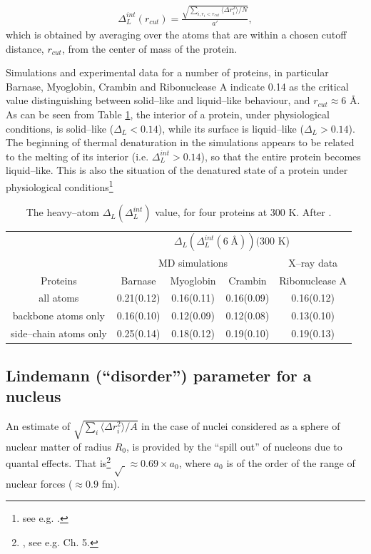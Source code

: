\begin{subappendices}
\begin{align}
\Delta^{int}_L(r_{cut})=\frac{\sqrt{\sum_{i,r_i<r_{cut}}\langle \Delta r_i^2\rangle/N}}{a'},
\end{align}  
which is obtained by averaging over the atoms that are within a chosen cutoff distance, $r_{cut}$, from the center of mass of the protein.

Simulations and experimental data for a number of proteins, in particular Barnase, Myoglobin, Crambin and Ribonuclease A indicate 0.14 as the critical value distinguishing between solid--like and liquid--like behaviour, and $r_{cut}\approx 6$ \AA. As can be seen from Table \ref{tab2C1}, the interior of a protein, under physiological conditions, is solid--like  ($\Delta_L<0.14$), while its surface is liquid--like ($\Delta_L>0.14$). The beginning of thermal denaturation in the simulations appears to be related to the melting of its interior (i.e. $\Delta^{int}_L>0.14$), so that the entire protein becomes liquid--like. This is also the situation of the denatured state of a protein under physiological conditions\footnote{see e.g. \cite{Rosner:17}.} 



\begin{table}[h]
 \begin{tabular}{|c|c|c|c|c|}
 \hline
 &\multicolumn{4}{|c|}{$\Delta_L(\Delta_L^{int}(6\;\text{\AA}))(300$ K)}\\
 \cline{2-5}
 &\multicolumn{3}{|c|}{MD simulations}&X--ray data\\
 \hline
 Proteins&Barnase&Myoglobin&Crambin&Ribonuclease A\\
 \hline
 all atoms&0.21(0.12)&0.16(0.11)&0.16(0.09)&0.16(0.12)\\
 backbone atoms only&0.16(0.10)&0.12(0.09)&0.12(0.08)&0.13(0.10)\\
 side--chain atoms only&0.25(0.14)&0.18(0.12)&0.19(0.10)&0.19(0.13)\\
 \hline
 \end{tabular}
 \caption{The heavy--atom $\Delta_L(\Delta_L^{int})$ value, for four proteins at 300 K. After \cite{Zhou:99}.}\label{tab2C1}
 \end{table}

\subsection{Lindemann (``disorder'') parameter for a nucleus}
An estimate of  $\sqrt{\sum_i\langle \Delta r_i^2\rangle/A}$ in the case of nuclei considered as a sphere of nuclear matter of radius $R_0$, is provided by the ``spill out'' of nucleons due to quantal effects. That is\footnote{\cite{Bertsch:05}, see e.g. Ch. 5.} $\sqrt{\;}\approx 0.69\times a_0$, where $a_0$ is of the order of the range of nuclear forces ($\approx 0.9$ fm).



\end{subappendices}
